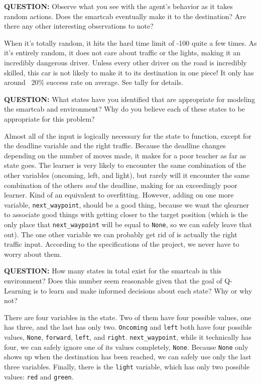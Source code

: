 \documentclass[11pt]{article}
\begin{document}
\textbf{QUESTION:} Observe what you see with the agent's behavior as it takes random actions. Does the smartcab eventually make it to the destination? Are there any other interesting observations to note?

When it's totally random, it hits the hard time limit of -100 quite a few times. As it's entirely random, it does not care about traffic or the lights, making it an incredibly dangerous driver. Unless every other driver on the road is incredibly skilled, this car is not likely to make it to its destination in one piece! It only has around ~20\% success rate on average. See tally for details.

\textbf{QUESTION:} What states have you identified that are appropriate for modeling the smartcab and environment? Why do you believe each of these states to be appropriate for this problem?

Almost all of the input is logically necessary for the state to function, except for the deadline variable and the right traffic. Because the deadline changes depending on the number of moves made, it makes for a poor teacher as far as state goes. The learner is very likely to encounter the same combination of the other variables (oncoming, left, and light), but rarely will it encounter the same combination of the others \emph{and} the deadline, making for an exceedingly poor learner. Kind of an equivalent to overfitting. However, adding on one more variable, \texttt{next\_waypoint}, should be a good thing, because we want the qlearner to associate good things with getting closer to the target position (which is the only place that \texttt{next\_waypoint} will be equal to \texttt{None}, so we can safely leave that out). The one other variable we can probably get rid of is actually the right traffic input. According to the specifications of the project, we never have to worry about them.

\textbf{QUESTION:} How many states in total exist for the smartcab in this environment? Does this number seem reasonable given that the goal of Q-Learning is to learn and make informed decisions about each state? Why or why not?

There are four variables in the state. Two of them have four possible values, one has three, and the last has only two. \texttt{Oncoming} and \texttt{left} both have four possible values, \texttt{None}, \texttt{forward}, \texttt{left}, and \texttt{right}. \texttt{next\_waypoint}, while it technically has four, we can safely ignore one of its values completely, \texttt{None}. Because \texttt{None} only shows up when the destination has been reached, we can safely use only the last three variables. Finally, there is the \texttt{light} variable, which has only two possible values: \texttt{red} and \texttt{green}.
\end{document}
